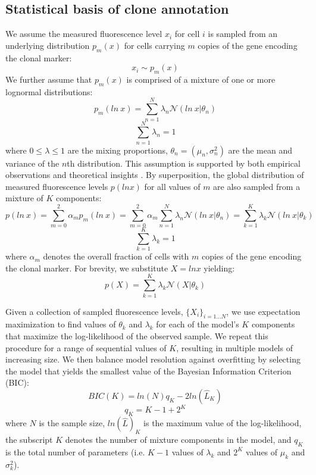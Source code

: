\subsection{Statistical basis of clone annotation} 
\label{clones:methods:annotation_math}

We assume the measured fluorescence level $x_i$ for cell $i$ is sampled from an underlying distribution $p_m(x)$ for cells carrying $m$ copies of the gene encoding the clonal marker:
\begin{equation}
x_i \sim p_m(x)
\end{equation}
We further assume that $p_m(x)$ is comprised of a mixture of one or more lognormal distributions:
\begin{equation}
p_m(ln\ x) = \sum^{N}_{n=1}\lambda_n \mathcal{N}(ln\ x|\theta_{n})
\end{equation}
\begin{equation}
\sum^{N}_{n=1}\lambda_n=1
\end{equation}
where $0 \leq \lambda \leq 1$ are the mixing proportions, $\theta_n=(\mu_n,\sigma_n^2)$ are the mean and variance of the $n$th distribution. This assumption is supported by both empirical observations and theoretical insights \cite{Furusawa2005,Beal2017}. By superposition, the global distribution of measured fluorescence levels $p(ln x)$ for all values of $m$ are also sampled from a mixture of $K$ components:
\begin{equation}
p(ln\ x) =  \sum^{2}_{m=0} \alpha_m p_m(ln\ x) = \sum^{2}_{m=0} \alpha_m 
\sum^{N}_{n=1}\lambda_n \mathcal{N}(ln\ x|\theta_{n}) = \sum^{K}_{k=1}\lambda_k \mathcal{N}(ln\ x|\theta_{k})
\end{equation}
\begin{equation}
\sum^{K}_{k=1}\lambda_k=1
\end{equation}
where $\alpha_m$ denotes the overall fraction of cells with $m$ copies of the gene encoding the clonal marker. For brevity, we substitute $X = ln x$ yielding:
\begin{equation}
p(X) = \sum^{K}_{k=1}\lambda_k \mathcal{N}(X|\theta_{k})
\end{equation}

Given a collection of sampled fluorescence levels, $\{X_i\}_{i=1 \ldots N}$, we use expectation maximization to find values of $\theta_k$ and $\lambda_k$ for each of the model's $K$ components that maximize the log-likelihood of the observed sample. We repeat this procedure for a range of sequential values of $K$, resulting in multiple models of increasing size. We then balance model resolution against overfitting by selecting the model that yields the smallest value of the Bayesian Information Criterion (BIC):
\begin{equation}
BIC(K) = ln(N)q_K - 2 ln(\hat{L}_K)
\end{equation}
\begin{equation}
q_K = K-1 + 2^K
\end{equation}
where $N$ is the sample size, $ln(\hat{L})_K$ is the maximum value of the log-likelihood, the subscript $K$ denotes the number of mixture components in the model, and $q_K$ is the total number of parameters (i.e. $K-1$ values of $\lambda_k$ and $2^K$ values of $\mu_k$ and $\sigma_k^2$).


